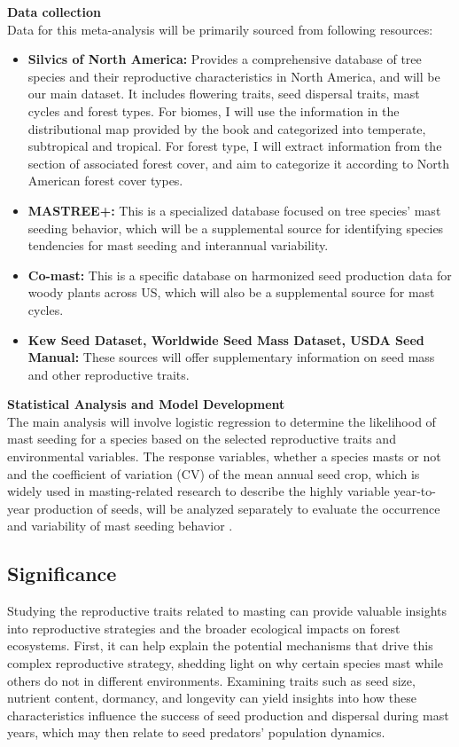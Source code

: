 \documentclass[11pt,letter]{article}
\begin{document}
\textbf{Data collection}\\
Data for this meta-analysis will be primarily sourced from following resources:
	\begin{itemize}
	\item \textbf{Silvics of North America:} Provides a comprehensive database of tree species and their reproductive characteristics in North America, and will be our main dataset. It includes flowering traits, seed dispersal traits, mast cycles and forest types. For biomes, I will use the information in the distributional map provided by the book and categorized into temperate, subtropical and tropical. For forest type, I will extract information from the section of associated forest cover, and aim to categorize it according to North American forest cover types.
	\item \textbf{MASTREE+:} This is a specialized database focused on tree species' mast seeding behavior, which will be a supplemental source for identifying species tendencies for mast seeding and interannual variability.
	\item \textbf{Co-mast:} This is a specific database on harmonized seed production data for woody plants across US, which will also be a supplemental source for mast cycles.
	\item \textbf{Kew Seed Dataset, Worldwide Seed Mass Dataset, USDA Seed Manual:} These sources will offer supplementary information on seed mass and other reproductive traits.
	\end{itemize}
\textbf{Statistical Analysis and Model Development}\\
The main analysis will involve logistic regression to determine the likelihood of mast seeding for a species based on the selected reproductive traits and environmental variables. The response variables, whether a species masts or not and the coefficient of variation (CV) of the mean annual seed crop,  which is widely used in masting-related research to describe the highly variable year-to-year production of seeds, will be analyzed separately to evaluate the occurrence and variability of mast seeding behavior \citep{kelly2002mast}.

\subsection{Significance} 
Studying the reproductive traits related to masting can provide valuable insights into reproductive strategies and the broader ecological impacts on forest ecosystems. First, it can help explain the potential mechanisms that drive this complex reproductive strategy, shedding light on why certain species mast while others do not in different environments. Examining traits such as seed size, nutrient content, dormancy, and longevity can yield insights into how these characteristics influence the success of seed production and dispersal during mast years, which may then relate to seed predators' population dynamics.
\end{document}
